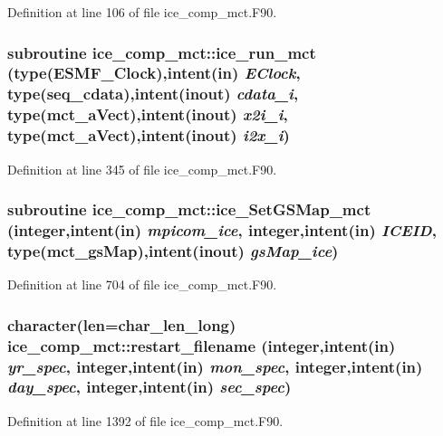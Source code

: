 Definition at line 106 of file ice\_\-comp\_\-mct.F90.\hypertarget{namespaceice__comp__mct_a7e9300fd6b2392c92d54b05f84464939}{
\subsubsection[{ice\_\-run\_\-mct}]{\setlength{\rightskip}{0pt plus 5cm}subroutine ice\_\-comp\_\-mct::ice\_\-run\_\-mct (type(ESMF\_\-Clock),intent(in) {\em EClock}, \/  type(seq\_\-cdata),intent(inout) {\em cdata\_\-i}, \/  type(mct\_\-aVect),intent(inout) {\em x2i\_\-i}, \/  type(mct\_\-aVect),intent(inout) {\em i2x\_\-i})}}
\label{namespaceice__comp__mct_a7e9300fd6b2392c92d54b05f84464939}


Definition at line 345 of file ice\_\-comp\_\-mct.F90.\hypertarget{namespaceice__comp__mct_a44b387bdc97aa66b1bd25afd2b68ec09}{
\subsubsection[{ice\_\-SetGSMap\_\-mct}]{\setlength{\rightskip}{0pt plus 5cm}subroutine ice\_\-comp\_\-mct::ice\_\-SetGSMap\_\-mct (integer,intent(in) {\em mpicom\_\-ice}, \/  integer,intent(in) {\em ICEID}, \/  type(mct\_\-gsMap),intent(inout) {\em gsMap\_\-ice})}}
\label{namespaceice__comp__mct_a44b387bdc97aa66b1bd25afd2b68ec09}


Definition at line 704 of file ice\_\-comp\_\-mct.F90.\hypertarget{namespaceice__comp__mct_a06dea082678c790cef2bcb75c338b6d2}{
\subsubsection[{restart\_\-filename}]{\setlength{\rightskip}{0pt plus 5cm}character(len=char\_\-len\_\-long) ice\_\-comp\_\-mct::restart\_\-filename (integer,intent(in) {\em yr\_\-spec}, \/  integer,intent(in) {\em mon\_\-spec}, \/  integer,intent(in) {\em day\_\-spec}, \/  integer,intent(in) {\em sec\_\-spec})}}
\label{namespaceice__comp__mct_a06dea082678c790cef2bcb75c338b6d2}


Definition at line 1392 of file ice\_\-comp\_\-mct.F90.